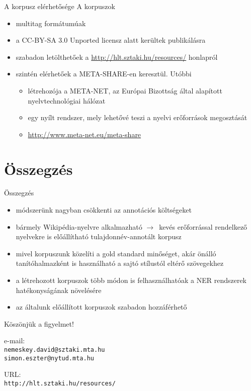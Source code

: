 \documentclass[utf8x,t]{beamer}
\newcommand{\vitem}{\item \vspace{4pt}}
\newcommand{\nyil}{$\rightarrow$\ }
\begin{document}
\begin{frame}{A korpusz elérhetősége}
\bigskip
A korpuszok
\begin{itemize}
\vitem multitag formátumúak
\vitem a CC-BY-SA 3.0 Unported licensz alatt kerültek publikálásra
\vitem szabadon letölthetőek a \url{http://hlt.sztaki.hu/resources/} honlapról
\vitem szintén elérhetőek a META-SHARE-en keresztül. Utóbbi
  \begin{itemize}
  \vitem létrehozója a META-NET, az Európai Bizottság által alapított nyelvtechnológiai hálózat
  \vitem egy nyílt rendszer, mely lehetővé teszi a nyelvi erőforrások megosztását
  \vitem \url{http://www.meta-net.eu/meta-share}
  \end{itemize}
\end{itemize}

\end{frame}

\section{Összegzés}
\begin{frame}{Összegzés}
  \bigskip
  \begin{itemize}
  \vitem módszerünk nagyban csökkenti az annotációs költségeket 
  \vitem bármely Wikipédia-nyelvre alkalmazható \nyil kevés erőforrással rendelkező nyelvekre is előállítható tulajdonnév-annotált korpusz
  \vitem mivel korpuszunk közelíti a gold standard minőséget, akár önálló tanítóhalmazként is használható a sajtó stílustól eltérő szövegekhez
  \vitem a létrehozott korpuszok több módon is felhasználhatóak a NER rendszerek hatékonyságának növelésére
  \vitem az általunk előállított korpuszok szabadon hozzáférhető
  \end{itemize}
  \vfill
\end{frame}

\begin{frame}

\bigskip

\bigskip

{\huge Köszönjük a figyelmet!}

\bigskip
\bigskip
\bigskip

e-mail: \\ {\tt nemeskey.david@sztaki.mta.hu \\ simon.eszter@nytud.mta.hu} \\

\bigskip
\bigskip

URL: \\ {\tt http://hlt.sztaki.hu/resources/}


\end{frame}
\end{document}
